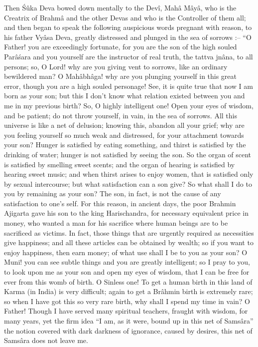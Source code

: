 Then \'S\^uka Deva bowed down mentally to the Dev\^i, Mah\^a M\^ay\^a, who is the Creatrix of Brahm\^a and the other Devas and who is the Controller of them all; and then began to speak the following auspicious words pregnant with reason, to his father Vy\^asa Deva, greatly distressed and plunged in the sea of sorrows :-- ``O Father! you are exceedingly fortunate, for you are the son of the high souled Par\^a\'sara and you yourself are the instructor of real truth, the tattva jn\^ana, to all persons; so, O Lord! why are you giving vent to sorrows, like an ordinary bewildered man? O Mah\^abh\^aga! why are you plunging yourself in this great error, though you are a high souled personage! See, it is quite true that now I am born as your son; but this I don't know what relation existed between you and me in my previous birth? So, O highly intelligent one! Open your eyes of wisdom, and be patient; do not throw yourself, in vain, in the sea of sorrows. All this universe is like a net of delusion; knowing this, abandon all your grief; why are you feeling yourself so much weak and distressed, for your attachment towards your son? Hunger is satisfied by eating something, and thirst is satisfied by the drinking of water; hunger is not satisfied by seeing the son. So the organ of scent is satisfied by smelling sweet scents; and the organ of hearing is satisfied by hearing sweet music; and when thirst arises to enjoy women, that is satisfied only by sexual intercourse; but what satisfaction can a son give? So what shall I do to you by remaining as your son? The son, in fact, is not the cause of any satisfaction to one's self. For this reason, in ancient days, the poor Brahmin Ajigarta gave his son to the king Harischandra, for necessary equivalent price in money, who wanted a man for his sacrifice where human beings are to be sacrificed as victims. In fact, those things that are urgently required as necessities give happiness; and all these articles can be obtained by wealth; so if you want to enjoy happiness, then earn money; of what use shall I be to you as your son? O Muni! you can see subtle things and you are greatly intelligent; so I pray to you, to look upon me as your son and open my eyes of wisdom, that I can be free for ever from this womb of birth. O Sinless one! To get a human birth in this land of Karma (in India) is very difficult; again to get a Br\^ahmin birth is extremely rare; so when I have got this so very rare birth, why shall I spend my time in vain? O Father! Though I have served many spiritual teachers, fraught with wisdom, for many years, yet the firm idea ``I am, as it were, bound up in this net of Sams\^ara'' the notion covered with dark darkness of ignorance, caused by desires, this net of Sams\^ara does not leave me.

